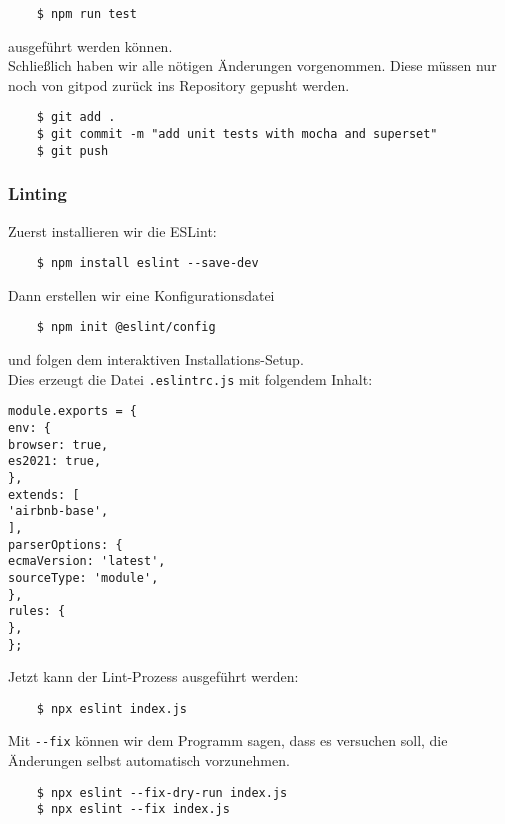 \begin{verbatim}
	$ npm run test
\end{verbatim}

\noindent
ausgeführt werden können. \\

\noindent
Schließlich haben wir alle nötigen Änderungen vorgenommen.
Diese müssen nur noch von gitpod zurück ins Repository gepusht werden.

\begin{verbatim}
	$ git add .
	$ git commit -m "add unit tests with mocha and superset"
	$ git push
\end{verbatim}


\subsubsection{Linting}
Zuerst installieren wir die ESLint:

\begin{verbatim}
	$ npm install eslint --save-dev
\end{verbatim}

\noindent
Dann erstellen wir eine Konfigurationsdatei

\begin{verbatim}
	$ npm init @eslint/config
\end{verbatim}

\noindent
und folgen dem interaktiven Installations-Setup. \\

\noindent
Dies erzeugt die Datei \verb|.eslintrc.js| mit folgendem Inhalt:

\begin{verbatim}
module.exports = {
env: {
browser: true,
es2021: true,
},
extends: [
'airbnb-base',
],
parserOptions: {
ecmaVersion: 'latest',
sourceType: 'module',
},
rules: {
},
};
\end{verbatim}

\noindent
Jetzt kann der Lint-Prozess ausgeführt werden:

\begin{verbatim}
	$ npx eslint index.js
\end{verbatim}

\noindent
Mit \verb|--fix| können wir dem Programm sagen,
dass es versuchen soll, die Änderungen selbst
automatisch vorzunehmen.

\begin{verbatim}
	$ npx eslint --fix-dry-run index.js
	$ npx eslint --fix index.js
\end{verbatim}


